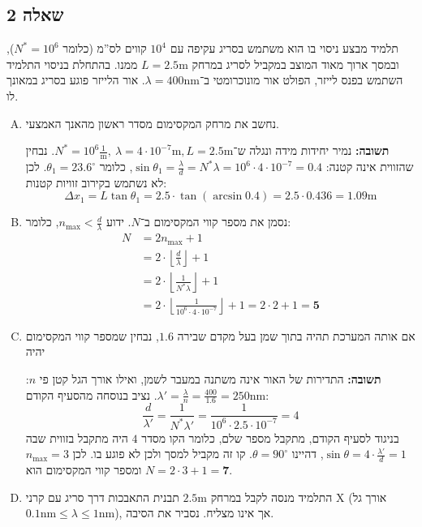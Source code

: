\documentclass[]{../../../tex/classes/styledArticle}
\renewcommand\lg{\lambda}
\newcommand\mrm[1]{\mathrm{#1}}
\newcommand\cl[1]{(#1)}
\begin{document}
	\subsection{שאלה 2}
	תלמיד מבצע ניסוי בו הוא משתמש בסריג עקיפה עם $10^{4}$ קווים לס''מ (כלומר $N^* =10^{6}$), ובמסך ארוך מאוד המוצב במקביל לסריג במרחק $L = 2.5\mathrm{m}$ ממנו. בהתחלת בניסוי התלמיד השתמש בפנס לייזר, הפולט אור מונוכרומטי ב־$\lg = 400\mathrm{nm}$. אור הלייזר פוגע בסריג במאונך לו. 
	\begin{enumerate}[(A)]
		\item נחשב את מרחק המקסימום מסדר ראשון מהאנך האמצעי. 
		
		\textbf{תשובה: }נמיר יחידות מידה ונגלה ש־$N^* = 10^{6}\frac{1}{\mrm{m}}, \ \lg = 4 \cdot 10^{-7}\mrm{m}, L = 2.5\mrm{m}$. נבחין שהזווית אינה קטנה: $\sin\theta_1 = \frac{\lg}{d} = N^*\lg = 10^{6} \cdot 4 \cdot 10^{-7} = 0.4$, כלומר $\theta_1 = 23.6^{\circ}$. לכן לא נשתמש בקירוב זוויות קטנות: 
		\[ \Delta x_1 = L \tan\theta_1 = 2.5 \cdot \tan\cl{\arcsin 0.4} = 2.5 \cdot 0.436 = \bm{1.09 \mrm{m}} \]
		
		\item נסמן את מספר קווי המקסימום ב־$N$. ידוע $n_{\max} < \frac{d}{\lg}$, כלומר: 
		\begin{align*}
			N &= 2n_{\max} + 1 \\
			&= 2 \cdot \left\lfloor \frac{d}{\lg} \right\rfloor + 1 \\
			&= 2 \cdot \left\lfloor \frac{1}{N^*\lg} \right\rfloor + 1 \\
			&= 2 \cdot \left\lfloor \frac{1}{10^{6} \cdot 4 \cdot 10^{-7}} \right\rfloor + 1 = 2 \cdot 2 + 1 = \bm{5}
		\end{align*}
		\item אם אותה המערכת תהיה בתוך שמן בעל מקדם שבירה $1.6$, נבחין שמספר קווי המקסימום יהיה 
		
		\textbf{תשובה: }התדירות של האור אינה משתנה במעבר לשמן, ואילו אורך הגל קטן פי $n$: $\lg' = \frac{\lg}{n} = \frac{400}{1.6} = 250\mrm{nm}$. נציב בנוסחה מהסעיף הקודם: 
		\[ \frac{d}{\lg'} = \frac{1}{N^*\lg'} = \frac{1}{10^{6} \cdot 2.5 \cdot 10^{-7}} = 4 \]
		בניגוד לסעיף הקודם, מתקבל מספר שלם, כלומר הקו מסדר $4$ היה מתקבל בזווית שבה $\sin\theta = 4 \cdot \frac{\lg'}{d} = 1$, דהיינו $\theta = 90^{\circ}$. קו זה מקביל למסך ולכן לא פוגע בו. לכן $n_{\max} = 3$ ומספר קווי המקסימום הוא $N = 2 \cdot 3 + 1 = \bm{7}$. 
		
		\item התלמיד מנסה לקבל במרחק $2.5\mrm{m}$ תבנית התאבכות דרך סריג עם קרני X (אורך גל $0.1\mrm{nm} \le \lg \le 1\mrm{nm}$), אך אינו מצליח. נסביר את הסיבה. 
		

\end{enumerate}
\end{document}
